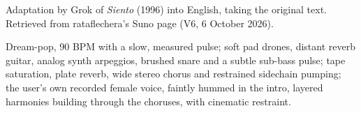 
\begin{notes}
Adaptation by Grok of \emph{Siento} (1996) into English, taking the original text. Retrieved from rataflechera's Suno page (V6, 6 October 2026).
\end{notes}
\begin{style}
Dream-pop, 90 BPM with a slow, measured pulse; soft pad drones, distant reverb guitar, analog synth arpeggios, brushed snare and a subtle sub-bass pulse; tape saturation, plate reverb, wide stereo chorus and restrained sidechain pumping; the user's own recorded female voice, faintly hummed in the intro, layered harmonies building through the choruses, with cinematic restraint.
\end{style}
